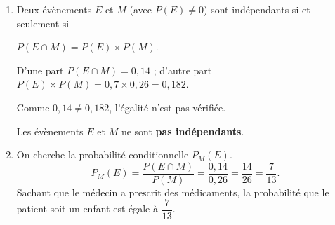 \begin{enumerate}
	\item Deux évènements $E$ et $M$ (avec $P(E) \neq 0$) sont indépendants si et seulement si
	
	$P(E \cap M) = P(E) \times P(M)$.

	D'une part $P(E \cap M) = 0,14$ ; d'autre part
	$P(E) \times P(M) = 0,7 \times 0,26 = 0,182$.

	Comme $0,14 \neq 0,182$, l'égalité n'est pas vérifiée. 

	Les évènements $E$ et $M$ ne sont \textbf{pas indépendants}.


	\item On cherche la probabilité conditionnelle $P_M(E)$.
	\[P_M(E) = \dfrac{P(E \cap M)}{P(M)} = \dfrac{0,14}{0,26} = \dfrac{14}{26} = \dfrac{7}{13}.\]
	Sachant que le médecin a prescrit des médicaments, la probabilité que le patient soit un
	enfant est égale à $\dfrac{7}{13}$.
\end{enumerate}
